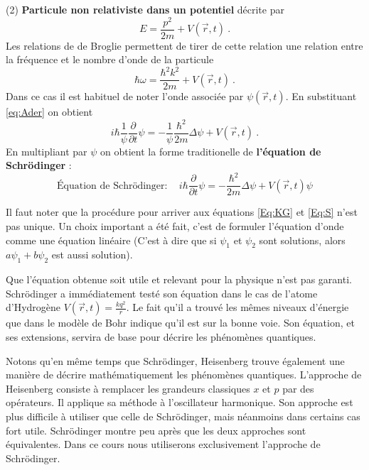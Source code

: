 \documentclass{book}
\begin{document}
(2) {\bf Particule non relativiste dans un potentiel} décrite par
$$E = \dfrac{p^2}{2m} + V(\vec r, t)\ .$$
Les relations de de Broglie permettent de tirer de cette relation une relation entre la fréquence et le nombre d'onde de la particule
$$\hbar \omega =  \dfrac{\hbar^2 k^2}{2m}  + V(\vec r, t)\ .$$
Dans ce cas il est habituel de noter l'onde associée par $\psi(\vec r, t)$. 
En substituant \eqref{eq:Ader} on obtient  
\begin{equation} 
i\hbar \dfrac{1}{\psi} \dfrac{\partial}{\partial t} \psi = - \dfrac{1}{\psi}  \dfrac{\hbar ^2}{2m} \Delta \psi + V(\vec r, t)\ .
\end{equation}
En multipliant par $\psi$ on obtient la forme traditionelle de 
\textbf{ l'équation de Schrödinger} :
\begin{equation} 
\boxed{\text{Équation de Schrödinger} : \quad
i\hbar \dfrac{\partial}{\partial t} \psi = -\dfrac{\hbar ^2}{2m} \Delta \psi + V(\vec r, t) \psi}
\label{Eq:S}
\end{equation}

Il faut noter que la procédure pour arriver aux équations \eqref{Eq:KG} et \eqref{Eq:S} n'est pas unique. Un choix important a été fait, c'est de formuler l'équation d'onde comme une équation linéaire (C'est à dire que si $\psi_1$ et $\psi_2$ sont solutions, alors $a \psi_1 + b \psi_2$ est aussi solution). 

Que l'équation obtenue soit utile et relevant pour la physique n'est pas garanti. Schrödinger a immédiatement testé son équation dans le cas de l'atome d'Hydrogène $V(\vec r, t) = \frac{k q^2}{r}$. Le fait qu'il a trouvé les mêmes niveaux d'énergie que dans le modèle de Bohr indique qu'il est sur la bonne voie. Son équation, et ses extensions, servira de base pour décrire les phénomènes quantiques.

Notons qu'en même temps que Schrödinger, Heisenberg trouve également une manière de décrire mathématiquement les phénomènes quantiques. L'approche de Heisenberg consiste à remplacer les grandeurs classiques $x$ et $p$ par des opérateurs. Il applique sa méthode à l'oscillateur harmonique. Son approche est plus difficile à utiliser que celle de Schrödinger, mais néanmoins dans certains cas fort utile. Schrödinger montre peu après que les deux approches sont équivalentes. Dans ce cours nous utiliserons exclusivement l'approche de Schrödinger.
\end{document}
